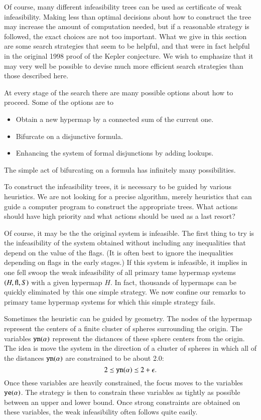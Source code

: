 Of course, many different infeasibility trees can be used as
certificate of weak infeasibility.  Making less than optimal
decisions about how to construct the tree may increase the amount
of computation needed, but if a reasonable strategy is followed,
the exact choices are not too important.  What we give in this
section are some search strategies that seem to be helpful, and
that were in fact helpful in the original 1998 proof of the Kepler
conjecture.  We wish to emphasize that it may very well be
possible to devise much more efficient search strategies than
those described here.

At every stage of the search there are many possible options about
how to proceed.  Some of the options are to
    \begin{itemize}
    \item Obtain a new hypermap by a connected sum of the current one.
    \item Bifurcate on a disjunctive formula.
    \item Enhancing the system of formal disjunctions by adding
    lookups.
    \end{itemize}
The simple act of bifurcating on a formula has infinitely many
possibilities.

To construct the infeasibility trees, it is necessary to be guided
by various heuristics.  We are not looking for a precise
algorithm, merely heuristics that can guide a computer program to
construct the appropriate trees. What actions should have high
priority and what actions should be used as a last resort?



Of course, it may be the the original system is infeasible.  The
first thing to try is the infeasibility of the system obtained
without including any inequalities that depend on the value of the
flags.  (It is often best to ignore the inequalities depending on
flags in the early stages.)  If this system is infeasible, it
implies in one fell swoop the weak infeasibility of all primary
tame hypermap systems $(H,{\operatorname{fl}},S)$ with a given hypermap $H$.
In fact, thousands of hypermaps can be quickly eliminated by this
one simple strategy.  We now confine our remarks to primary tame
hypermap systems for which this simple strategy fails.

Sometimes the heuristic can be guided by geometry.  The nodes of
the hypermap represent the centers of a finite cluster of spheres
surrounding the origin.
 The variables ${\operatorname{{\texttt{yn}}}}(\alpha)$ represent the distances of
 these sphere centers from the origin.  The idea is move the
 system in the direction of a cluster of spheres in which all of
 the distances ${\operatorname{{\texttt{yn}}}}(\alpha)$ are constrained to be about
 2.0:
    $$2 \preceq {\operatorname{{\texttt{yn}}}}(\alpha) \preceq 2+\epsilon.$$
 Once these variables are heavily constrained, the focus moves to the
 variables ${\operatorname{{\texttt{ye}}}}(\alpha)$.  The strategy is then to constrain
 these variables as tightly as possible between an upper and lower
 bound.  Once strong constraints are obtained on these variables,
 the weak infeasibility often follows quite easily.

